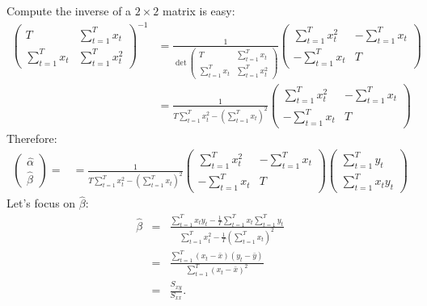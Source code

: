 \documentclass{article}
\begin{document}
Compute the inverse of a $2\times2$ matrix is easy:
\begin{align*}
\begin{pmatrix} T & \sum_{t=1}^{T}x_{t}\\ \sum_{t=1}^{T}x_{t} & \sum_{t=1}^{T}x_{t}^2\end{pmatrix}^{-1} &= \frac{1}{\det\begin{pmatrix} T & \sum_{t=1}^{T}x_{t}\\ \sum_{t=1}^{T}x_{t} & \sum_{t=1}^{T}x_{t}^2\end{pmatrix}} \begin{pmatrix} \sum_{t=1}^{T}x_{t}^2 & -\sum_{t=1}^{T}x_{t}\\ -\sum_{t=1}^{T}x_{t} & T\end{pmatrix}\\
&=\frac{1}{T\sum_{t=1}^{T}x_{t}^{2}-\left( \sum_{t=1}^{T}x_{t}\right) ^{2}} \begin{pmatrix} \sum_{t=1}^{T}x_{t}^2 & -\sum_{t=1}^{T}x_{t}\\ -\sum_{t=1}^{T}x_{t} & T\end{pmatrix}
\end{align*}
Therefore:
\begin{align*}
\begin{pmatrix} \hat{\alpha} \\ \hat{\beta} \end{pmatrix} =& =\frac{1}{T\sum_{t=1}^{T}x_{t}^{2}-\left( \sum_{t=1}^{T}x_{t}\right) ^{2}} \begin{pmatrix} \sum_{t=1}^{T}x_{t}^2 & -\sum_{t=1}^{T}x_{t}\\ -\sum_{t=1}^{T}x_{t} & T\end{pmatrix}  \begin{pmatrix} \sum_{t=1}^{T}y_{t}\\ \sum_{t=1}^{T}x_t y_{t}\end{pmatrix}
\end{align*}
Let's focus on $\hat{\beta}$:
\begin{eqnarray}
\hat{\beta} 
&=&\frac{\sum_{t=1}^{T}x_{t}y_{t}-\frac{1}{T}\sum_{t=1}^{T}x_{t}%
	\sum_{t=1}^{T}y_{t}}{\sum_{t=1}^{T}x_{t}^{2}-\frac{1}{T}\left(
	\sum_{t=1}^{T}x_{t}\right) ^{2}}  \nonumber \\
&=&\frac{\sum_{t=1}^{T}\left( x_{t}-\bar{x}\right) \left( y_{t}-\bar{y}%
	\right) }{\sum_{t=1}^{T}\left( x_{t}-\bar{x}\right) ^{2}}  \nonumber \\
&=&\frac{S_{xy}}{S_{xx}}.  \label{defbetahat}
\end{eqnarray}%
\end{document}
